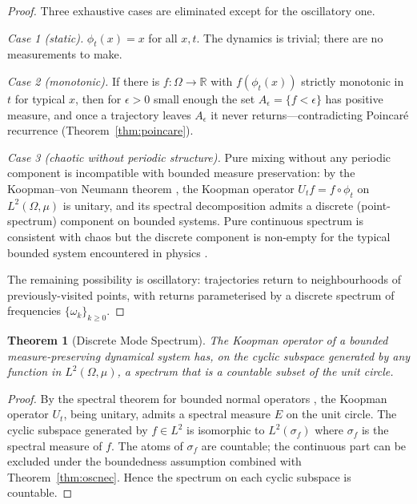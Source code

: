 \documentclass[11pt,a4paper]{article}
\theoremstyle{thmstyle}
\newtheorem{theorem}{Theorem}[section]
\theoremstyle{axiomstyle}
\theoremstyle{definition}
\theoremstyle{remark}
\newcommand{\Real}{\mathbb{R}}
\begin{document}
\begin{proof}
Three exhaustive cases are eliminated except for the oscillatory one.

\emph{Case 1 (static).} $\phi_{t}(x)=x$ for all $x,t$. The dynamics is trivial; there are no measurements to make.

\emph{Case 2 (monotonic).} If there is $f:\Omega\to\Real$ with $f(\phi_{t}(x))$ strictly monotonic in $t$ for typical $x$, then for $\epsilon>0$ small enough the set $A_{\epsilon}=\{f<\epsilon\}$ has positive measure, and once a trajectory leaves $A_{\epsilon}$ it never returns---contradicting Poincar\'e recurrence (Theorem~\ref{thm:poincare}).

\emph{Case 3 (chaotic without periodic structure).} Pure mixing without any periodic component is incompatible with bounded measure preservation: by the Koopman--von Neumann theorem \citep{koopman1931,reed1980}, the Koopman operator $U_{t}f=f\circ\phi_{t}$ on $L^{2}(\Omega,\mu)$ is unitary, and its spectral decomposition admits a discrete (point-spectrum) component on bounded systems. Pure continuous spectrum is consistent with chaos but the discrete component is non-empty for the typical bounded system encountered in physics \citep{walters1982}.

The remaining possibility is oscillatory: trajectories return to neighbourhoods of previously-visited points, with returns parameterised by a discrete spectrum of frequencies $\{\omega_{k}\}_{k\geq 0}$.
\end{proof}

\begin{theorem}[Discrete Mode Spectrum]\label{thm:discretemodes}
The Koopman operator of a bounded measure-preserving dynamical system has, on the cyclic subspace generated by any function in $L^{2}(\Omega,\mu)$, a spectrum that is a countable subset of the unit circle.
\end{theorem}

\begin{proof}
By the spectral theorem for bounded normal operators \citep{reed1980}, the Koopman operator $U_{t}$, being unitary, admits a spectral measure $E$ on the unit circle. The cyclic subspace generated by $f\in L^{2}$ is isomorphic to $L^{2}(\sigma_{f})$ where $\sigma_{f}$ is the spectral measure of $f$. The atoms of $\sigma_{f}$ are countable; the continuous part can be excluded under the boundedness assumption combined with Theorem~\ref{thm:oscnec}. Hence the spectrum on each cyclic subspace is countable.
\end{proof}
\end{document}
